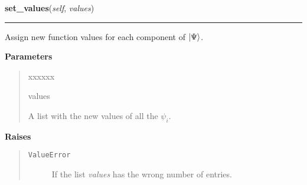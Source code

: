 \hspace{.8\funcindent}\begin{boxedminipage}{\funcwidth}

    \raggedright \textbf{set\_values}(\textit{self}, \textit{values})

    \vspace{-1.5ex}

    \rule{\textwidth}{0.5\fboxrule}
\setlength{\parskip}{2ex}
    Assign new function values for each component of
    $\Ket{\Psi}$.

\setlength{\parskip}{1ex}
      \textbf{Parameters}
      \vspace{-1ex}

      \begin{quote}
        \begin{Ventry}{xxxxxx}

          \item[values]

          A list with the new values of all the $\psi_i$.

        \end{Ventry}

      \end{quote}

      \textbf{Raises}
    \vspace{-1ex}

      \begin{quote}
        \begin{description}

          \item[\texttt{ValueError}]

          If the list \textit{values} has the wrong number of entries.

        \end{description}

      \end{quote}

    \end{boxedminipage}

    \label{WaveFunction:WaveFunction:get_norm}

    \vspace{0.5ex}

